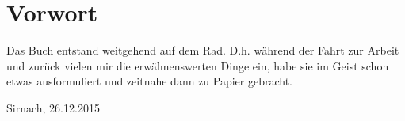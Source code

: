 \chapter{Vorwort}

Das Buch entstand weitgehend auf dem Rad.
D.h. während der Fahrt zur Arbeit und zurück vielen mir die erwähnenswerten Dinge ein, habe sie im Geist schon etwas ausformuliert und zeitnahe dann zu Papier gebracht.

Sirnach, 26.12.2015
